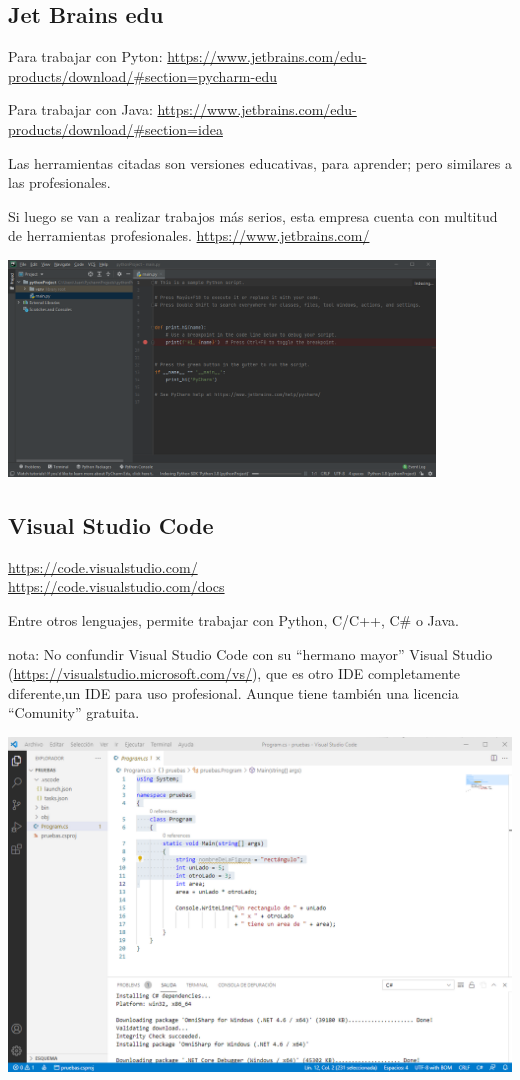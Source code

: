 \documentclass[spanish,12pt,a4paper,final,oneside]{book}
\begin{document}
\subsection{Jet Brains edu}

Para trabajar con Pyton: \url{https://www.jetbrains.com/edu-products/download/#section=pycharm-edu}

Para trabajar con Java: \url{https://www.jetbrains.com/edu-products/download/#section=idea}

Las herramientas citadas son versiones educativas, para aprender; pero similares a las profesionales.

Si luego se van a realizar trabajos más serios, esta empresa cuenta con multitud de herramientas profesionales. \url{https://www.jetbrains.com/}

\includegraphics[width=0.85\textwidth]{pantallazo de PyCharm.png}


\subsection{Visual Studio Code}

\url{https://code.visualstudio.com/}
\\ \url{https://code.visualstudio.com/docs}

Entre otros lenguajes, permite trabajar con Python, C/C++, C\# o Java.

nota: No confundir Visual Studio Code con su ``hermano mayor'' Visual Studio (\url{https://visualstudio.microsoft.com/vs/}), que es otro IDE completamente diferente,un IDE para uso profesional. Aunque tiene también una licencia ``Comunity'' gratuita.

\includegraphics[width=\textwidth]{pantallazo de VSCode.png}
\end{document}
